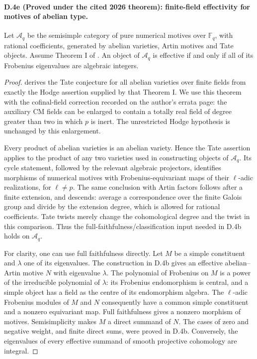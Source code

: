 \paragraph{D.4e (Proved under the cited 2026 theorem): finite-field effectivity for motives of abelian type.}
Let $\mathcal A_q$ be the semisimple category of pure numerical motives
over $\mathbb F_q$, with rational coefficients, generated by abelian
varieties, Artin motives and Tate objects. Assume Theorem I of
\citet{D_VanHoftenSempliner2026}. An object of $\mathcal A_q$ is effective
if and only if all of its Frobenius eigenvalues are algebraic integers.

\begin{proof}
\citet[Theorem 7.1, author version p.~25]{D_Milne1999} derives the Tate
conjecture for all abelian varieties over finite fields from exactly the
Hodge assertion supplied by that Theorem I. We use this theorem with
the cofinal-field correction recorded on the author's errata page:
the auxiliary CM fields can be enlarged to contain a totally real
field of degree greater than two in which $p$ is inert. The unrestricted
Hodge hypothesis is unchanged by this enlargement.

Every product of abelian varieties is an abelian variety. Hence the
Tate assertion applies to the product of any two varieties used in
constructing objects of $\mathcal A_q$. Its cycle statement, followed
by the relevant algebraic projectors, identifies morphisms of numerical
motives with Frobenius-equivariant maps of their $\ell$-adic
realizations, for $\ell\ne p$. The same conclusion with Artin factors
follows after a finite extension, and descends: average a correspondence
over the finite Galois group and divide by the extension degree,
which is allowed for rational coefficients. Tate twists merely change
the cohomological degree and the twist in this comparison. Thus the
full-faithfulness/classification input needed in D.4b holds on
$\mathcal A_q$.

For clarity, one can use full faithfulness directly. Let $M$ be a
simple constituent and $\lambda$ one of its eigenvalues. The
construction in D.4b gives an effective abelian--Artin motive $N$
with eigenvalue $\lambda$. The polynomial of Frobenius on $M$ is a
power of the irreducible polynomial of $\lambda$: its Frobenius
endomorphism is central, and a simple object has a field as the centre
of its endomorphism algebra. The $\ell$-adic Frobenius modules of
$M$ and $N$ consequently have a common simple constituent and a
nonzero equivariant map. Full faithfulness gives a nonzero morphism
of motives. Semisimplicity makes $M$ a direct summand of $N$.
The cases of zero and negative weight, and finite direct sums, were
proved in D.4b. Conversely, the eigenvalues of every effective
summand of smooth projective cohomology are integral.
\end{proof}

